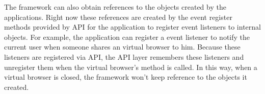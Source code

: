\apireferencefig{}


The framework can also obtain references to the objects created by the applications.  
Right now
these references are created by the event register methods provided by API for
the application to register event listeners to internal objects. For example,
the application can register a event listener to notify the current user when
someone shares an virtual browser to him. Because these listeners are
registered via API, the API layer remembers these listeners and unregister
them when the virtual browser's  method is called. In this way,
when a virtual browser is closed, the framework won't keep reference to the
objects it created.
